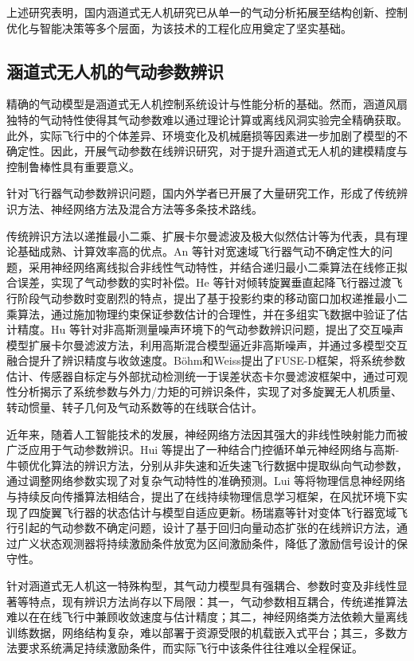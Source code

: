 上述研究表明，国内涵道式无人机研究已从单一的气动分析拓展至结构创新、控制优化与智能决策等多个层面，为该技术的工程化应用奠定了坚实基础。

\subsection{涵道式无人机的气动参数辨识}
精确的气动模型是涵道式无人机控制系统设计与性能分析的基础。然而，涵道风扇独特的气动特性使得其气动参数难以通过理论计算或离线风洞实验完全精确获取。此外，实际飞行中的个体差异、环境变化及机械磨损等因素进一步加剧了模型的不确定性。因此，开展气动参数在线辨识研究，对于提升涵道式无人机的建模精度与控制鲁棒性具有重要意义。

针对飞行器气动参数辨识问题，国内外学者已开展了大量研究工作，形成了传统辨识方法、神经网络方法及混合方法等多条技术路线。

传统辨识方法以递推最小二乘、扩展卡尔曼滤波及极大似然估计等为代表，具有理论基础成熟、计算效率高的优点。An 等针对宽速域飞行器气动不确定性大的问题，采用神经网络离线拟合非线性气动特性，并结合递归最小二乘算法在线修正拟合误差，实现了气动参数的实时补偿\cite{an2023drones}。He 等针对倾转旋翼垂直起降飞行器过渡飞行阶段气动参数时变剧烈的特点，提出了基于投影约束的移动窗口加权递推最小二乘算法，通过施加物理约束保证参数估计的合理性，并在多组实飞数据中验证了估计精度\cite{he2025asme}。Hu 等针对非高斯测量噪声环境下的气动参数辨识问题，提出了交互噪声模型扩展卡尔曼滤波方法，利用高斯混合模型逼近非高斯噪声，并通过多模型交互融合提升了辨识精度与收敛速度\cite{hu2026asce}。Böhm和Weiss提出了FUSE-D框架，将系统参数估计、传感器自标定与外部扰动检测统一于误差状态卡尔曼滤波框架中，通过可观性分析揭示了系统参数与外力/力矩的可辨识条件，实现了对多旋翼无人机质量、转动惯量、转子几何及气动系数等的在线联合估计\cite{bohm2023fuse}。

近年来，随着人工智能技术的发展，神经网络方法因其强大的非线性映射能力而被广泛应用于气动参数辨识。Hui 等提出了一种结合门控循环单元神经网络与高斯-牛顿优化算法的辨识方法，分别从非失速和近失速飞行数据中提取纵向气动参数，通过调整网络参数实现了对复杂气动特性的准确预测\cite{hui2025航空学报}。Lui 等将物理信息神经网络与持续反向传播算法相结合，提出了在线持续物理信息学习框架，在风扰环境下实现了四旋翼飞行器的状态估计与模型自适应更新\cite{liu2025aerospace}。杨瑞嘉等针对变体飞行器宽域飞行引起的气动参数不确定问题，设计了基于回归向量动态扩张的在线辨识方法，通过广义状态观测器将持续激励条件放宽为区间激励条件，降低了激励信号设计的保守性\cite{yang2025宇航学报}。

针对涵道式无人机这一特殊构型，其气动力模型具有强耦合、参数时变及非线性显著等特点，现有辨识方法尚存以下局限：其一，气动参数相互耦合，传统递推算法难以在在线飞行中兼顾收敛速度与估计精度；其二，神经网络类方法依赖大量离线训练数据，网络结构复杂，难以部署于资源受限的机载嵌入式平台；其三，多数方法要求系统满足持续激励条件，而实际飞行中该条件往往难以全程保证。

